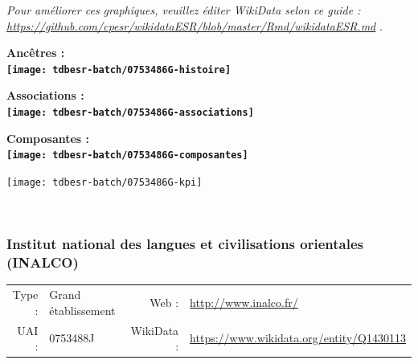 \documentclass[12pt,french,]{article}
\begin{document}
\textit{\scriptsize Pour améliorer ces graphiques, veuillez éditer WikiData selon ce guide :  \href{https://github.com/cpesr/wikidataESR/blob/master/Rmd/wikidataESR.md}{https://github.com/cpesr/wikidataESR/blob/master/Rmd/wikidataESR.md}}
.

\vspace{1cm}  
\begin{minipage}[b]{0.50\textwidth}\begin{center} \bf Ancêtres : \\  
\texttt{[image: tdbesr-batch/0753486G-histoire]} \end{center}\end{minipage}\begin{minipage}[b]{0.50\textwidth}\begin{center} \bf Associations : \\  
\texttt{[image: tdbesr-batch/0753486G-associations]} \end{center}\end{minipage}

\hrulefill

\begin{center} \bf Composantes : \\  
\texttt{[image: tdbesr-batch/0753486G-composantes]} \end{center}

\begin{center}\texttt{[image: tdbesr-batch/0753486G-kpi]} \end{center}\checkoddpage

\ifoddpage \fi ~\newpage  

\hypertarget{institut-national-des-langues-et-civilisations-orientales-inalco}{%
\subsubsection{Institut national des langues et civilisations orientales
(INALCO)}\label{institut-national-des-langues-et-civilisations-orientales-inalco}}

\begin{tabular*}{\textwidth}{rp{5cm}rl}  
\hline  
Type : & Grand établissement & Web : &\href{http://www.inalco.fr/}{http://www.inalco.fr/} \\  
UAI : & 0753488J & WikiData : & \href{https://www.wikidata.org/entity/Q1430113}{https://www.wikidata.org/entity/Q1430113} \\  
\hline  
\end{tabular*}
\end{document}
